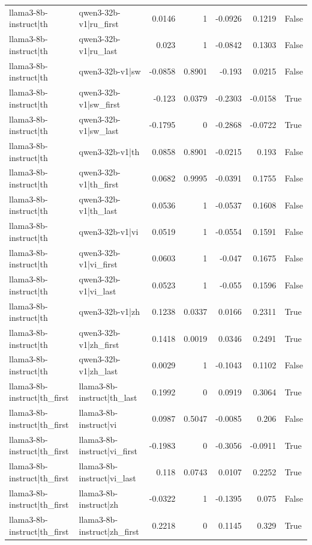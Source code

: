 \begin{table}
\begin{tabular}{l l r r r r l}
llama3-8b-instruct|th & qwen3-32b-v1|ru_first & 0.0146 & 1 & -0.0926 & 0.1219 & False \\
llama3-8b-instruct|th & qwen3-32b-v1|ru_last & 0.023 & 1 & -0.0842 & 0.1303 & False \\
llama3-8b-instruct|th & qwen3-32b-v1|sw & -0.0858 & 0.8901 & -0.193 & 0.0215 & False \\
llama3-8b-instruct|th & qwen3-32b-v1|sw_first & -0.123 & 0.0379 & -0.2303 & -0.0158 & True \\
llama3-8b-instruct|th & qwen3-32b-v1|sw_last & -0.1795 & 0 & -0.2868 & -0.0722 & True \\
llama3-8b-instruct|th & qwen3-32b-v1|th & 0.0858 & 0.8901 & -0.0215 & 0.193 & False \\
llama3-8b-instruct|th & qwen3-32b-v1|th_first & 0.0682 & 0.9995 & -0.0391 & 0.1755 & False \\
llama3-8b-instruct|th & qwen3-32b-v1|th_last & 0.0536 & 1 & -0.0537 & 0.1608 & False \\
llama3-8b-instruct|th & qwen3-32b-v1|vi & 0.0519 & 1 & -0.0554 & 0.1591 & False \\
llama3-8b-instruct|th & qwen3-32b-v1|vi_first & 0.0603 & 1 & -0.047 & 0.1675 & False \\
llama3-8b-instruct|th & qwen3-32b-v1|vi_last & 0.0523 & 1 & -0.055 & 0.1596 & False \\
llama3-8b-instruct|th & qwen3-32b-v1|zh & 0.1238 & 0.0337 & 0.0166 & 0.2311 & True \\
llama3-8b-instruct|th & qwen3-32b-v1|zh_first & 0.1418 & 0.0019 & 0.0346 & 0.2491 & True \\
llama3-8b-instruct|th & qwen3-32b-v1|zh_last & 0.0029 & 1 & -0.1043 & 0.1102 & False \\
llama3-8b-instruct|th_first & llama3-8b-instruct|th_last & 0.1992 & 0 & 0.0919 & 0.3064 & True \\
llama3-8b-instruct|th_first & llama3-8b-instruct|vi & 0.0987 & 0.5047 & -0.0085 & 0.206 & False \\
llama3-8b-instruct|th_first & llama3-8b-instruct|vi_first & -0.1983 & 0 & -0.3056 & -0.0911 & True \\
llama3-8b-instruct|th_first & llama3-8b-instruct|vi_last & 0.118 & 0.0743 & 0.0107 & 0.2252 & True \\
llama3-8b-instruct|th_first & llama3-8b-instruct|zh & -0.0322 & 1 & -0.1395 & 0.075 & False \\
llama3-8b-instruct|th_first & llama3-8b-instruct|zh_first & 0.2218 & 0 & 0.1145 & 0.329 & True \\

\end{tabular}
\end{table}
